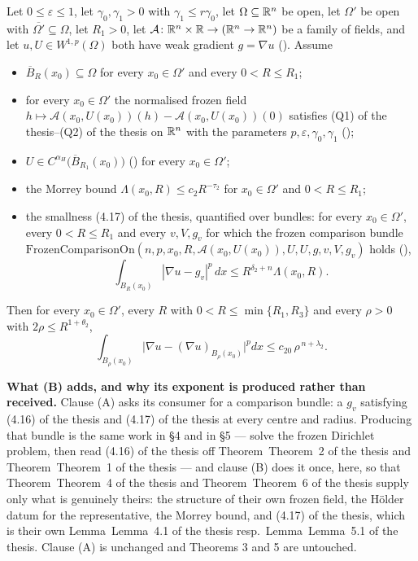 \begin{helper}
Let $0\le\varepsilon\le1$, let $\gamma_0,\gamma_1>0$ with
$\gamma_1\le r\gamma_0$, let $\Omega\subseteq\mathbb{R}^n$ be open, let $\Omega'$ be
open with $\overline{\Omega'}\subseteq\Omega$, let $R_1>0$, let
$\mathcal A\colon\mathbb{R}^n\times\mathbb{R}\to(\mathbb{R}^n\to\mathbb{R}^n)$ be a family of fields, and let
$u,U\in W^{1,p}(\Omega)$ both have weak gradient $g=\nabla u$
().  Assume
\begin{itemize}
\item $\overline B_R(x_0)\subseteq\Omega$ for every $x_0\in\Omega'$ and every
  $0<R\le R_1$;
\item for every $x_0\in\Omega'$ the normalised frozen field
  $h\mapsto\mathcal A(x_0,U(x_0))(h)-\mathcal A(x_0,U(x_0))(0)$ satisfies
  (Q1) of the thesis--(Q2) of the thesis on $\mathbb{R}^n$ with the parameters
  $p,\varepsilon,\gamma_0,\gamma_1$ ();
\item $U\in C^{\alpha_H}\bigl(\overline B_{R_1}(x_0)\bigr)$
  () for every $x_0\in\Omega'$;
\item the Morrey bound $\Lambda(x_0,R)\le c_2R^{-\tau_2}$ for $x_0\in\Omega'$
  and $0<R\le R_1$;
\item the smallness (4.17) of the thesis, quantified over bundles: for every
  $x_0\in\Omega'$, every $0<R\le R_1$ and every $v,V,g_v$ for which the frozen
  comparison bundle
  $\mathrm{FrozenComparisonOn}(n,p,x_0,R,\mathcal A(x_0,U(x_0)),U,U,g,v,V,g_v)$
  holds (),
  \[
  \int_{B_R(x_0)}|\nabla u-g_v|^p\,dx\le R^{\delta_2+n}\Lambda(x_0,R).
  \]
\end{itemize}
Then for every $x_0\in\Omega'$, every $R$ with $0<R\le\min\{R_1,R_3\}$ and every
$\rho>0$ with $2\rho\le R^{1+\theta_2}$,
\[
\int_{B_\rho(x_0)}\bigl|\nabla u-(\nabla u)_{B_\rho(x_0)}\bigr|^p dx
\le c_{20}\,\rho^{\,n+\lambda_2}.
\]

\medskip
\noindent\textbf{What (B) adds, and why its exponent is produced rather than
received.}  Clause (A) asks its consumer for a comparison bundle: a $g_v$
satisfying (4.16) of the thesis and (4.17) of the thesis at every centre and radius.
Producing that bundle is the same work in \S4 and in \S5 --- solve the frozen
Dirichlet problem, then read (4.16) of the thesis off Theorem~Theorem~2 of the thesis and
Theorem~Theorem~1 of the thesis --- and clause (B) does it once, here, so that
Theorem~Theorem~4 of the thesis and Theorem~Theorem~6 of the thesis supply only what is genuinely
theirs: the structure of their own frozen field, the H\"older datum for the
representative, the Morrey bound, and (4.17) of the thesis, which is their own
Lemma~Lemma~4.1 of the thesis resp.\ Lemma~Lemma~5.1 of the thesis.  Clause (A) is unchanged and
Theorems 3 and 5 are untouched.


\end{helper}
